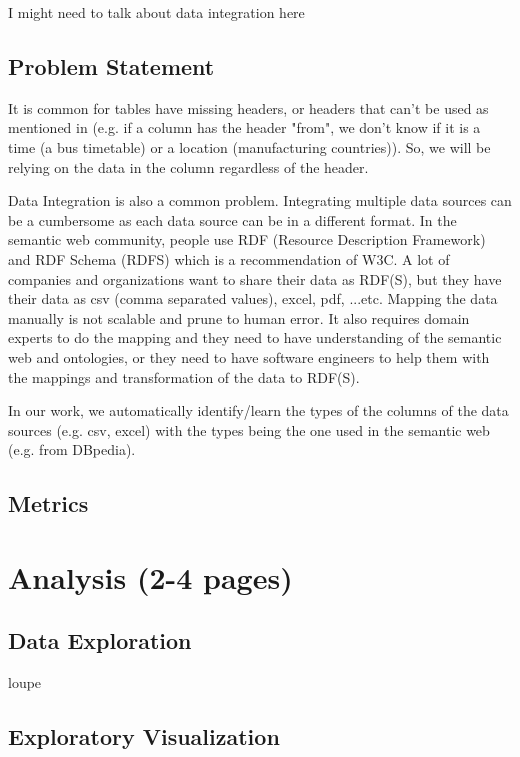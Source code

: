 \documentclass{article}
\newcommand{\comm}[2][inline]{\color{red}#2\color{black}}
\begin{document}
\comm{I might need to talk about data integration here}

\subsection{Problem Statement}
It is common for tables have missing headers, or headers that can\rq t be used as mentioned in \cite{webtables-power-2008} (e.g. if a column has the header "from", we don\rq t know if it is a time (a bus timetable) or a location (manufacturing countries)). So, we will be relying on the data in the column regardless of the header. 

Data Integration is also a common problem. Integrating multiple data sources can be a cumbersome as each data source can be in a different format. In the semantic web community, people use RDF (Resource Description Framework) and RDF Schema (RDFS) which is a recommendation of W3C. A lot of companies and organizations want to share their data as RDF(S), but they have their data as csv (comma separated values), excel, pdf, ...etc. Mapping the data manually is not scalable and prune to human error. It also requires domain experts to do the mapping and they need to have understanding of the semantic web and ontologies, or they need to have software engineers to help them with the mappings and transformation of the data to RDF(S).

In our work, we automatically identify/learn the types of the columns of the data sources (e.g. csv, excel) with the types being the one used in the semantic web (e.g. from DBpedia\cite{dbpedia-site}).


\subsection{Metrics}



\section{Analysis (2-4 pages)}

\subsection{Data Exploration}
loupe

\subsection{Exploratory Visualization}
\end{document}
